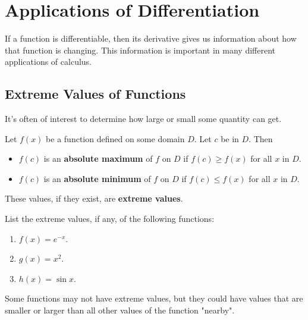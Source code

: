 \documentclass[10pt,]{book}
\newcommand{\terminology}[1]{\textbf{#1}}
\theoremstyle{ptxplainnotitle}
\theoremstyle{ptxplaintitle}
\theoremstyle{ptxplainnotitle}
\theoremstyle{ptxplaintitle}
\theoremstyle{ptxplainnotitle}
\theoremstyle{ptxplaintitle}
\theoremstyle{ptxdefinitionnotitle}
\theoremstyle{ptxdefinitiontitle}
\theoremstyle{ptxdefinitionnotitle}
\theoremstyle{ptxdefinitiontitle}
\theoremstyle{ptxdefinitionnotitle}
\theoremstyle{ptxdefinitiontitle}
\theoremstyle{ptxdefinitionnotitle}
\theoremstyle{ptxdefinitiontitle}
\theoremstyle{ptxdefinitionnotitle}
\theoremstyle{ptxdefinitiontitle}
\numberwithin{equation}{section}
\begin{document}
\chapter[{Applications of Differentiation}]{Applications of Differentiation}\label{applications-differentiation}
\hypertarget{p-308}{}%
If a function is differentiable, then its derivative gives us information about how that function is changing. This information is important in many different applications of calculus.%
\typeout{************************************************}
\typeout{************************************************}
\section[{Extreme Values of Functions}]{Extreme Values of Functions}\label{section-extreme-values-of-functions}
\hypertarget{p-309}{}%
It's often of interest to determine how large or small some quantity can get.%
\begin{definition}\label{definition-absolute-extrema}
\hypertarget{p-310}{}%
Let \(f(x)\) be a function defined on some domain \(D\). Let \(c\) be in \(D\). Then \leavevmode%
\begin{itemize}[label=\textbullet]
\item{}\(f(c)\) is an \terminology{absolute maximum} of \(f\) on \(D\) if \(f(c)\geq f(x)\) for all \(x\) in \(D\).%
\item{}\(f(c)\) is an \terminology{absolute minimum} of \(f\) on \(D\) if \(f(c)\leq f(x)\) for all \(x\) in \(D\).%
\end{itemize}
 These values, if they exist, are \terminology{extreme values}.%
\end{definition}
\begin{example}\label{example-71}
\hypertarget{p-311}{}%
List the extreme values, if any, of the following functions: \leavevmode%
\begin{enumerate}
\item\hypertarget{li-19}{}\(f(x) = e^{-x}\).%
\item\hypertarget{li-20}{}\(g(x) = x^{2}\).%
\item\hypertarget{li-21}{}\(h(x) = \sin x\).%
\end{enumerate}
%
\end{example}
\hypertarget{p-312}{}%
Some functions may not have extreme values, but they could have values that are smaller or larger than all other values of the function "nearby".%
\end{document}

